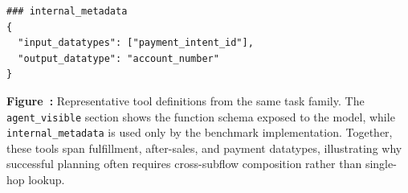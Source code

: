 \documentclass{llmxive}
\begin{document}
\begin{center}
\begin{tcolorbox}
\begin{lstlisting}[basicstyle=\ttfamily\footnotesize,breaklines=true,columns=fullflexible,keepspaces=true]
### internal_metadata
{
  "input_datatypes": ["payment_intent_id"],
  "output_datatype": "account_number"
}
\end{lstlisting}


\end{tcolorbox}
\end{center}

\label{fig:case_data_tools}
\smallskip
\noindent\parbox{\textwidth}{
\textbf{Figure~\thefigure:} Representative tool definitions from the same task family. The \texttt{agent\_visible} section shows the function schema exposed to the model, while \texttt{internal\_metadata} is used only by the benchmark implementation. Together, these tools span fulfillment, after-sales, and payment datatypes, illustrating why successful planning often requires cross-subflow composition rather than single-hop lookup.
}
\end{document}
